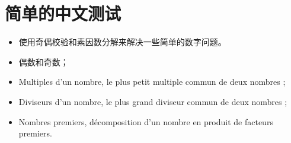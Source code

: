 \documentclass[11pt,a4paper,x11names,usenames,dvipsnames,svgnames,oneside]{ctexbook}
\begin{document}
\pagestyle{empty}
	\tableofcontents
	\chapter{简单的中文测试}
	\begin{tcolorbox}[breakable,enhanced,
		opacityback=0.75,opacitybacktitle=0.25,
		colback=pink!5!white,colframe=purple,
		title=\begin{center}
			\begin{Huge}
				标题例子
			\end{Huge}
		\end{center}]
		\begin{itemize}
			\item 使用奇偶校验和素因数分解来解决一些简单的数字问题。
		\end{itemize}
	\end{tcolorbox}
	\begin{tcolorbox}[breakable,enhanced,
		opacityback=0.75,opacitybacktitle=0.25,
		colback=pink!5!white,colframe=purple,
		title=\begin{center}
			\begin{Huge}
				本章概述
			\end{Huge}
		\end{center}]
		\begin{itemize}
			\item 偶数和奇数；
			\item Multiples d'un nombre, le plus petit multiple commun de deux nombres ;
			\item Diviseurs d'un nombre, le plus grand diviseur commun de deux nombres ;
			\item Nombres premiers, décomposition d'un nombre en produit de facteurs premiers.
		\end{itemize}
	\end{tcolorbox}
	
	
\end{document}
